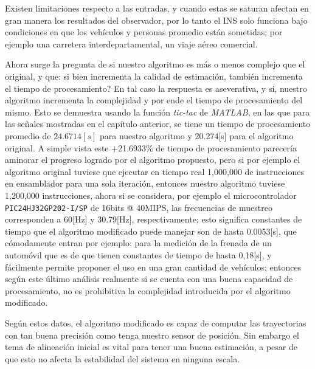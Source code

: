 \documentclass[10pt]{report}
\numberwithin{equation}{chapter}
\numberwithin{algorithm}{chapter}
\begin{document}
Existen limitaciones respecto a las entradas, y cuando estas se saturan afectan en gran manera los resultados del observador, por lo tanto el INS solo funciona bajo condiciones en que los vehículos y personas promedio están sometidas; por ejemplo una carretera interdepartamental, un viaje aéreo comercial.\par
Ahora surge la pregunta de si nuestro algoritmo es más o menos complejo que el original, y que: si bien incrementa la calidad de estimación, también incrementa el tiempo de procesamiento? En tal caso la respuesta es aseverativa, y sí, nuestro algoritmo incrementa la complejidad y por ende el tiempo de procesamiento del mismo. Esto se demuestra usando la función \emph{tic-tac} de \textsl{MATLAB}, en las que para las señales mostradas en el capítulo anterior, se tiene un tiempo de procesamiento promedio de $24.6714[s]$ para nuestro algoritmo y 20.274[s] para el algoritmo original. A simple vista este +21.6933\% de tiempo de procesamiento parecería aminorar el progreso logrado por el algoritmo propuesto, pero si por ejemplo el algoritmo original tuviese que ejecutar en tiempo real 1,000,000 de instrucciones en ensamblador para una sola iteración, entonces nuestro algoritmo tuviese 1,200,000 instrucciones, ahora si se considera, por ejemplo el microcontrolador \texttt{PIC24HJ32GP202-I/SP} de 16bits @ 40MIPS, las frecuencias de muestreo corresponden a 60[Hz] y 30.79[Hz], respectivamente; esto significa constantes de tiempo que el algoritmo modificado puede manejar son de hasta 0.0053[s], que cómodamente entran por ejemplo: para la medición de la frenada de un automóvil que es de que tienen constantes de tiempo de hasta 0,18[s], y fácilmente permite proponer el uso en una gran cantidad de vehículos; entonces según este último análisis realmente si se cuenta con una buena capacidad de procesamiento, no es prohibitiva la complejidad introducida por el algoritmo modificado.\par
Según estos datos, el algoritmo modificado es capaz de computar las trayectorias con tan buena precisión como tenga nuestro sensor de posición. Sin embargo el tema de alineación inicial es vital para tener una buena estimación, a pesar de que esto no afecta la estabilidad del sistema en ninguna escala.\par
\end{document}
